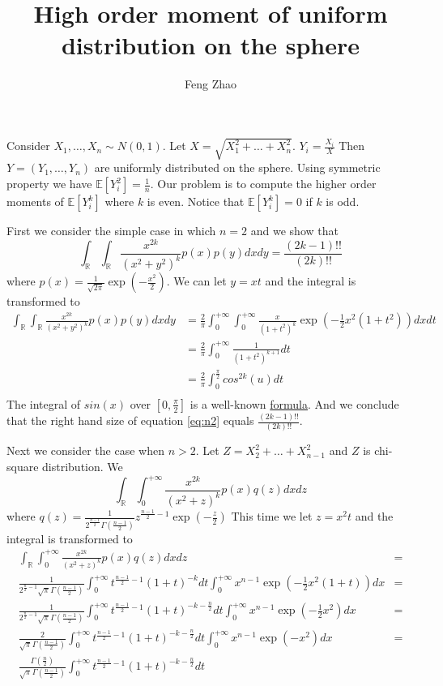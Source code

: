 \documentclass{article}
\title{High order moment of uniform distribution on the sphere}
\author{Feng Zhao}
\def\E{\mathbb{E}}
\def\R{\mathbb{R}}
\begin{document}
\maketitle
Consider $X_1, \dots, X_n \sim N(0, 1)$. Let $X = \sqrt{X_1^2 + \dots + X_n^2}$.
$Y_i = \frac{X_i}{X}$ Then $Y=(Y_1, \dots, Y_n)$ are uniformly distributed on the sphere.
Using symmetric property we have $\E[Y_i^2] = \frac{1}{n}$. Our problem is to compute the higher order moments of $\E[Y_i^k]$ where $k$ is even. Notice that $\E[Y_i^k]=0$ if $k$ is odd.

First we consider the simple case in which $n=2$ and we show that 
\begin{equation}\label{eq:n2}
\int_{\R}\int_{\R} \frac{x^{2k}}{(x^2+y^2)^k} p(x)p(y)dxdy = \frac{(2k-1)!!}{(2k)!!}
\end{equation}
where $p(x) = \frac{1}{\sqrt{2\pi}} \exp(-\frac{x^2}{2})$.
We can let $y=xt$ and the integral is transformed to 
\begin{align*}
\int_{\R}\int_{\R} \frac{x^{2k}}{(x^2+y^2)^k} p(x)p(y)dxdy & =
\frac{2}{\pi}\int_{0}^{+\infty}\int_{0}^{+\infty} \frac{x}{(1+t^2)^k} \exp(-\frac{1}{2}x^2(1+t^2))dxdt \\
&= 
\frac{2}{\pi}\int_{0}^{+\infty} \frac{1}{(1+t^2)^{k+1}}dt \\
&= \frac{2}{\pi}\int_{0}^{\frac{\pi}{2}} cos^{2k}(u)dt \\
\end{align*}
The integral of $sin(x)$ over $[0, \frac{\pi}{2}]$ is a well-known \href{https://math.stackexchange.com/questions/50447/integration-of-powers-of-the-sin-x}{formula}. And we conclude that the right hand size of equation \eqref{eq:n2} equals
$\frac{(2k-1)!!}{(2k)!!}$.

Next we consider the case when $n>2$. Let $Z = X_2^2 + \dots + X_{n-1}^2$ and $Z$ is chi-square distribution. We 
\begin{equation}\label{eq:n3}
\int_{\R}\int_{0}^{+\infty} \frac{x^{2k}}{(x^2+z)^k} p(x)q(z)dxdz
\end{equation}
where $q(z) = \frac{1}{2^{\frac{n-1}{2}}\Gamma(\frac{n-1}{2})} z ^{\frac{n-1}{2} - 1} \exp(-\frac{z}{2})$
This time we let $z=x^2 t$ and the integral is transformed to 
\begin{align*}
\int_{\R}\int_{0}^{+\infty} \frac{x^{2k}}{(x^2+z)^k} p(x)q(z)dxdz & = \\
\frac{1}{2^{\frac{n}{2}-1}\sqrt{\pi}\Gamma(\frac{n-1}{2})} \int_{0}^{+\infty}t^{\frac{n-1}{2}-1}(1+t)^{-k}dt\int_{0}^{+\infty}x^{n-1} \exp(-\frac{1}{2}x^2(1+t)) dx &=
\\
\frac{1}{2^{\frac{n}{2}-1}\sqrt{\pi}\Gamma(\frac{n-1}{2})} \int_{0}^{+\infty}t^{\frac{n-1}{2}-1}(1+t)^{-k-\frac{n}{2}}dt\int_{0}^{+\infty}x^{n-1} \exp(-\frac{1}{2}x^2) dx &=
\\
\frac{2}{\sqrt{\pi}\Gamma(\frac{n-1}{2})} \int_{0}^{+\infty}t^{\frac{n-1}{2}-1}(1+t)^{-k-\frac{n}{2}}dt\int_{0}^{+\infty}x^{n-1} \exp(-x^2) dx &=
\\
\frac{\Gamma(\frac{n}{2})}{\sqrt{\pi}\Gamma(\frac{n-1}{2})} \int_{0}^{+\infty}t^{\frac{n-1}{2}-1}(1+t)^{-k-\frac{n}{2}}dt
\end{align*}
\end{document}
